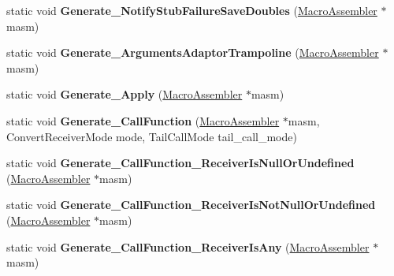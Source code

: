 \begin{DoxyCompactItemize}
\item 
static void {\bfseries Generate\+\_\+\+Notify\+Stub\+Failure\+Save\+Doubles} (\hyperlink{classv8_1_1internal_1_1_macro_assembler}{Macro\+Assembler} $\ast$masm)\hypertarget{classv8_1_1internal_1_1_builtins_aa07970f0498ae2556002f8b3b325d41b}{}\label{classv8_1_1internal_1_1_builtins_aa07970f0498ae2556002f8b3b325d41b}

\item 
static void {\bfseries Generate\+\_\+\+Arguments\+Adaptor\+Trampoline} (\hyperlink{classv8_1_1internal_1_1_macro_assembler}{Macro\+Assembler} $\ast$masm)\hypertarget{classv8_1_1internal_1_1_builtins_a705c32fea3d2efb613915adf7afcf196}{}\label{classv8_1_1internal_1_1_builtins_a705c32fea3d2efb613915adf7afcf196}

\item 
static void {\bfseries Generate\+\_\+\+Apply} (\hyperlink{classv8_1_1internal_1_1_macro_assembler}{Macro\+Assembler} $\ast$masm)\hypertarget{classv8_1_1internal_1_1_builtins_aa66253a8c33eb1a25a4cdf6f74501610}{}\label{classv8_1_1internal_1_1_builtins_aa66253a8c33eb1a25a4cdf6f74501610}

\item 
static void {\bfseries Generate\+\_\+\+Call\+Function} (\hyperlink{classv8_1_1internal_1_1_macro_assembler}{Macro\+Assembler} $\ast$masm, Convert\+Receiver\+Mode mode, Tail\+Call\+Mode tail\+\_\+call\+\_\+mode)\hypertarget{classv8_1_1internal_1_1_builtins_ae993476b3759a8af876ccca47a145c52}{}\label{classv8_1_1internal_1_1_builtins_ae993476b3759a8af876ccca47a145c52}

\item 
static void {\bfseries Generate\+\_\+\+Call\+Function\+\_\+\+Receiver\+Is\+Null\+Or\+Undefined} (\hyperlink{classv8_1_1internal_1_1_macro_assembler}{Macro\+Assembler} $\ast$masm)\hypertarget{classv8_1_1internal_1_1_builtins_af0bbbfff628283dc41d3d00ddcb88c3f}{}\label{classv8_1_1internal_1_1_builtins_af0bbbfff628283dc41d3d00ddcb88c3f}

\item 
static void {\bfseries Generate\+\_\+\+Call\+Function\+\_\+\+Receiver\+Is\+Not\+Null\+Or\+Undefined} (\hyperlink{classv8_1_1internal_1_1_macro_assembler}{Macro\+Assembler} $\ast$masm)\hypertarget{classv8_1_1internal_1_1_builtins_a1e1a839c86ef38c525629d17e1241296}{}\label{classv8_1_1internal_1_1_builtins_a1e1a839c86ef38c525629d17e1241296}

\item 
static void {\bfseries Generate\+\_\+\+Call\+Function\+\_\+\+Receiver\+Is\+Any} (\hyperlink{classv8_1_1internal_1_1_macro_assembler}{Macro\+Assembler} $\ast$masm)\hypertarget{classv8_1_1internal_1_1_builtins_a070bd7b632abde1ad43c528844e711df}{}\label{classv8_1_1internal_1_1_builtins_a070bd7b632abde1ad43c528844e711df}


\end{DoxyCompactItemize}
